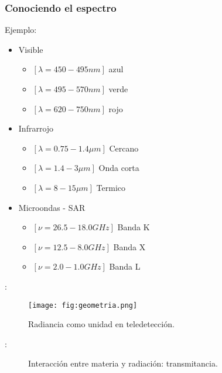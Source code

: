 \begin{frame}
  \frametitle{Conociendo el espectro}
  \begin{exampleblock}{Ejemplo:}
    \begin{itemize}
      \item Visible
      \begin{itemize}
        \item<1> $[\lambda=450-495 nm]$ {\color{blue} azul}
        \item<1> $[\lambda=495-570 nm]$ {\color{green} verde}
        \item<1> $[\lambda=620-750 nm]$ {\color{red} rojo}
      \end{itemize}
      \item Infrarrojo
      \begin{itemize}
        \item<2> $[\lambda=0.75-1.4\mu m]$ Cercano
        \item<2> $[\lambda=1.4-3\mu m]$ Onda corta
        \item<2> $[\lambda=8-15\mu m]$ Termico
      \end{itemize}
      \item Microondas - SAR
      \begin{itemize}
        \item<3> $[\nu = 26.5 -18.0 GHz]$ Banda K
        \item<3> $[\nu = 12.5 - 8.0 GHz]$ Banda X
        \item<3> $[\nu = 2.0 - 1.0 GHz] $ Banda L
      \end{itemize}
    \end{itemize}
  \end{exampleblock}
\end{frame}


\begin{frame}{\secname : \subsecname}
  \begin{figure}
    \centering
    \texttt{[image: fig:geometria.png]}
    \caption{Radiancia como unidad en teledetección.}
    \label{}
  \end{figure}
\end{frame}

\begin{frame}{\secname : \subsecname}
  \begin{figure}
    \centering
    \caption{Interacción entre materia y radiación: transmitancia.}
    \label{}
  \end{figure}
\end{frame}

